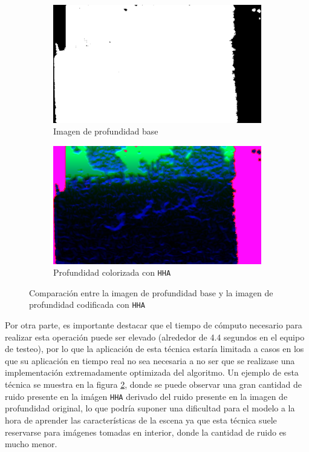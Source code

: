 \documentclass[12pt,a4paper]{report}
\begin{document}
\begin{figure}[!h]
    \centering
    \begin{subfigure}{0.45\textwidth}
        \centering
        \includegraphics[width=\textwidth]{media/data/depth_gueese.png}
        \caption{Imagen de profundidad base}
        \label{fig:depth-base-hha}
    \end{subfigure}
    \hfill
    \begin{subfigure}{0.45\textwidth}
        \centering
        \includegraphics[width=\textwidth]{media/data/hha_gueese.png}
        \caption{Profundidad colorizada con \texttt{HHA}}
        \label{fig:hha-colorization}
    \end{subfigure}
    \caption{Comparación entre la imagen de profundidad base y la imagen de profundidad codificada con \texttt{HHA}}
    \label{fig:hha-comparison}
\end{figure}

Por otra parte, es importante destacar que el tiempo de cómputo necesario para realizar esta operación puede ser elevado (alrededor de 4.4 segundos en el equipo de testeo), por lo que la aplicación de esta técnica estaría limitada a casos en los que su aplicación en tiempo real no sea necesaria a no ser que se realizase una implementación extremadamente optimizada del algoritmo. Un ejemplo de esta técnica se muestra en la figura \ref{fig:hha-colorization}, donde se puede observar una gran cantidad de ruido presente en la imágen \texttt{HHA} derivado del ruido presente en la imagen de profundidad original, lo que podría suponer una dificultad para el modelo a la hora de aprender las características de la escena ya que esta técnica suele reservarse para imágenes tomadas en interior, donde la cantidad de ruido es mucho menor.
\end{document}
